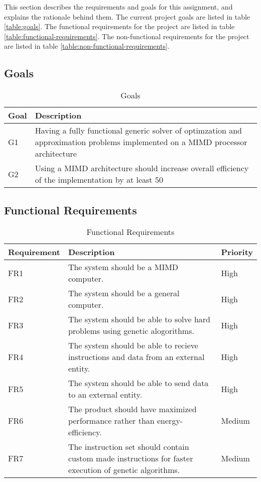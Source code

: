 This section describes the requirements and goals for this assignment, and explains the rationale behind them.
The current project goals are listed in table \vref{table:goals}.
The functional requirements for the project are listed in table \vref{table:functional-requirements}.
The non-functional requirements for the project are listed in table \vref{table:non-functional-requirements}.
\subsection{Goals}
\begin{table}[H]
 \begin{center}
 \begin{tabular}{| l | p{10cm} |}
 \hline
 Goal& Description\\
 \hline
 G1 & Having a fully functional generic solver of optimzation and approximation problems implemented on a MIMD processor architecture  \\
 G2 & Using a MIMD architecture should increase overall efficiency of the implementation by at least 50\\%
 \hline
 \end{tabular}
 \caption{Goals}
 \label{table:goals}
 \end{center}
 \end{table}
 \subsection{Functional Requirements}

 \begin{table}[H]
 \begin{center}
 \begin{tabular}{| l | p{7cm} | l |}
 \hline
 Requirement & Description & Priority\\
 \hline
 FR1 & The system should be a MIMD computer. & High \\
 FR2 & The system should be a general computer. & High \\
 FR3 & The system should be able to solve hard problems using genetic alogorithms. & High \\
 FR4 & The system should be able to recieve instructions and data from an external entity. & High \\
 FR5 & The system should be able to send data to an external entity. & High \\
 FR6 & The product should have maximized performance rather than energy-efficiency. & Medium \\
 FR7 & The instruction set should contain custom made instructions for faster execution of genetic algorithms. & Medium \\
 \hline
 \end{tabular}
 \caption{Functional Requirements}
 \label{table:functional-requirements}
 \end{center}
 \end{table}

